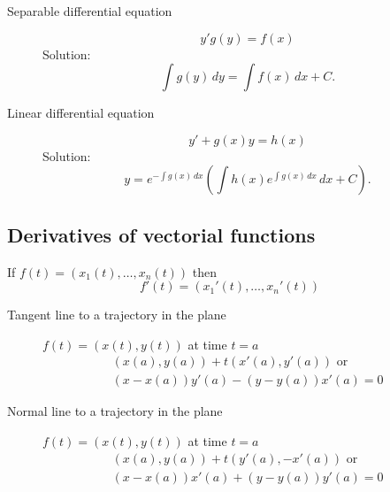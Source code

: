 \begin{multicols}{2}
	\begin{tcolorbox}[hbox, title=Solving first order ODE]
		\begin{minipage}{0.4\textwidth}
			\flushleft
			\begin{description}
				\item[Separable differential equation] 
			  \[
			    y'g(y)=f(x)
				\]
				Solution:
				\[
					\int g(y)\,dy = \int f(x)\,dx+C.
				\]
				\item[Linear differential equation] 
			  \[
					y'+g(x)y = h(x)
				\]
				Solution:
				\[
					y=e^{-\int g(x)\,dx}\left(\int h(x)e^{\int g(x)\,dx}\,dx+C\right).
				\]
			\end{description}
		\end{minipage}
	\end{tcolorbox}



\subsection*{Derivatives of vectorial functions}

	\begin{tcolorbox}[hbox, title=Derivative of a vectorial function]
		\begin{minipage}{0.4\textwidth}
			\flushleft
			If $f(t)=(x_1(t),\ldots, x_n(t))$ then
			\[
				f'(t)=(x_1'(t),\ldots, x_n'(t))
			\]
		\end{minipage}
	\end{tcolorbox}

	\begin{tcolorbox}[hbox, title=Tangent and normal lines in the plane]
		\begin{minipage}{0.4\textwidth}
			\flushleft
			\begin{description}
				\item[Tangent line to a trajectory in the plane] \mbox{$f(t)=(x(t),y(t))$} at time $t=a$				      
				\[
					\begin{array}{c}
						(x(a),y(a))+t(x'(a),y'(a)) \mbox{ or } \\
						(x-x(a))y'(a)-(y-y(a))x'(a)=0
					\end{array}      
				\]
				\item[Normal line to a trajectory in the plane] \mbox{$f(t)=(x(t),y(t))$} at time $t=a$
				\[
					\begin{array}{c}
						(x(a),y(a))+t(y'(a),-x'(a)) \mbox{ or }\\
						(x-x(a))x'(a)+(y-y(a))y'(a)=0
					\end{array}      
				\]
			\end{description}
		\end{minipage}
	\end{tcolorbox}


\end{multicols}
